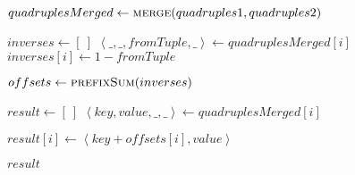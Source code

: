 \begin{frame}[containsverbatim]{\insertionseriesexampleframe}
\begin{columns}[c]
\begin{column}{0.35\textwidth}
{\begin{minipage}[c]{\textwidth}
\begin{algorithm}[H]
\begin{algorithmic}[1]
                                            \label{insertionseriesSortMerge before merge}
                                            \State $quadruplesMerged \gets \Call{merge}{quadruples1, quadruples2}$
                                            \label{insertionseriesSortMerge after merge}
                        
                                            \State $inverses \gets \left[\ \right]$
                                                \State $\left<\_, \_, fromTuple, \_\right> \gets quadruplesMerged{\left[i\right]}$
                                                \State $inverses{\left[i\right]} \gets 1 - fromTuple$
                                            \EndFor
                                            \label{insertionseriesSortMerge after inverses}

                                            \label{insertionseriesSortMerge before prefixSum}
                                            \State $offsets \gets \Call{prefixSum}{inverses}$
                                            \label{insertionseriesSortMerge after prefixSum}
                        
                                            \State $result \gets \left[\ \right]$
                                                \State $\left<key, value, \_, \_\right> \gets quadruplesMerged{\left[i\right]}$
                                                
                                                \State $result{\left[i\right]} \gets \left<key + offsets{\left[i\right]}, value\right>$
                                            \EndFor
                                            \label{insertionseriesSortMerge after fix}
                                            
                                            \State \Return $result$
                                        \EndFunction
                                    \end{algorithmic}
                                \end{algorithm}
                            \endgroup
                        \end{minipage}
                    }
                \end{column}


\end{columns}
\end{frame}
